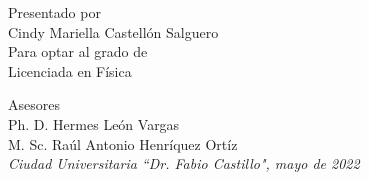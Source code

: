 \begin{titlepage}
\begin{center}
	\vspace{2.0cm}
	\large
	Presentado por\\
	Cindy Mariella Castellón Salguero\\
	\vspace{0.8cm}
	\large
	Para optar al grado de\\
	Licenciada en F\'isica	
	
	\vspace{1.5cm}
	Asesores\\
	Ph. D. Hermes Le\'on Vargas\\
	M. Sc. Ra\'ul Antonio Henr\'iquez Ort\'iz\\
	
	\vspace{2.5cm}
	\textit{Ciudad Universitaria ``Dr. Fabio Castillo", mayo de 2022}
	\end{center}
\end{titlepage}